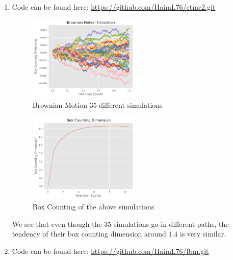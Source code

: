 \documentclass{article}
\begin{document}
\begin{enumerate}
\item Code can be found here: \url{https://github.com/HaimL76/ctmc2.git}

\begin{figure}[h]
\caption{Brownian Motion 35 different simulations}
\centering
\includegraphics[width=0.5\textwidth]{brownian_motion_simulation.png}
\end{figure}
\begin{figure}[h]
\caption{Box Counting of the above simulations}
\centering
\includegraphics[width=0.5\textwidth]{box_counting_dimensions.png}
\end{figure}
We see that even though the 35 simulations go in different paths, the tendency of their box counting dimension around $1.4$ is very similar.

\item Code can be found here: \url{https://github.com/HaimL76/fbm.git}


\end{enumerate}
\end{document}

